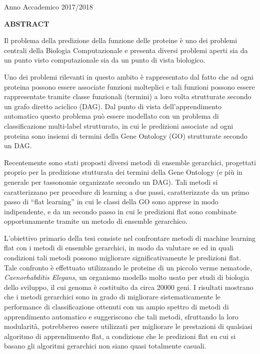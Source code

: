 \documentclass[12pt]{report}
\begin{document}
\begin{titlepage}
\begin{center}
    \vfill
    {\large{{Anno Accademico 2017/2018}}}
  \end{center}
\end{titlepage}

%
%
%
%

% 
% 

\Large
 \begin{center}
\textbf{ABSTRACT}
\end{center}

\hspace{10pt}



\normalsize

Il problema della predizione della funzione delle proteine \`e uno dei problemi centrali della Biologia Computazionale e presenta diversi problemi aperti sia da un punto visto computazionale sia da un punto di vista biologico.

Uno dei problemi rilevanti in questo ambito \`e rappresentato dal fatto che ad ogni proteina possono essere associate funzioni molteplici e tali funzioni possono essere rappresentate tramite classe funzionali (termini) a loro volta strutturate secondo un grafo diretto aciclico (DAG). Dal punto di vista dell'apprendimento automatico questo problema pu\`o essere modellato con un problema di classificazione multi-label strutturato, in cui le predizioni associate ad ogni proteina sono insiemi di termini della Gene Ontology (GO) strutturate secondo un DAG.

Recentemente sono stati proposti diversi metodi di ensemble gerarchici, progettati proprio per la predizione stutturata dei termini della Gene Ontology (e pi\`u in generale per tassonomie organizzate secondo un DAG). Tali metodi si caratterizzano per procedure di learning a due passi, caratterizzate da un primo passo di ``flat learning'' in cui le classi della GO sono apprese in modo indipendente, e da un secondo passo in cui le predizioni flat sono combinate opportunamente tramite un metodo di ensemble gerarchico.

L'obiettivo primario della tesi  consiste nel confrontare metodi di machine learning flat con i metodi di ensemble gerarchici, in modo da valutare se ed in quali condizioni tali metodi possono migliorare significativamente le predizioni flat. 
Tale confronto  \`e effettuato utilizzando le proteine di un piccolo verme nematode, \emph{Caenorhabditis Elegans}, un organismo modello molto usato per studi di biologia dello sviluppo, il cui genoma  \`e costituito da circa 20000 geni.
I risultati mostrano che i metodi gerarchici sono in grado di migliorare sistematicamente le performance di classificazione ottenuti con un ampio spettro di metodi di apprendimento automatico e suggeriscono che tali metodi, sfruttando la loro modularit\`a, potrebbereo essere utilizzati per migliorare le prestazioni di qualsiasi algoritmo di apprendimento flat, a condizione che le predizioni flat su cui si basano gli algoritmi gerarchici non siano quasi totalmente casuali.
\end{document}
